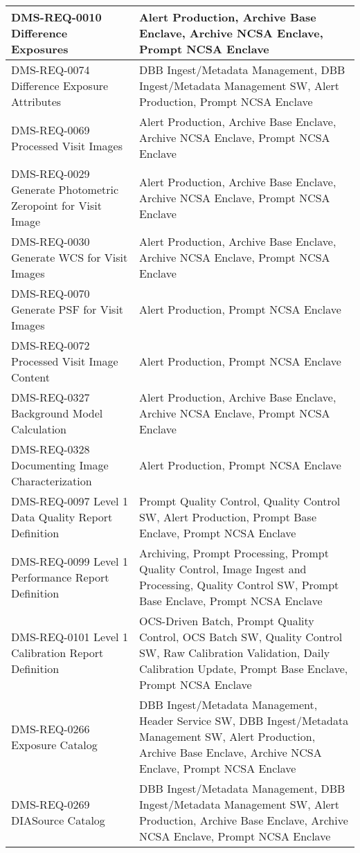 \begin{longtable}{p{}p{}}
DMS-REQ-0010 Difference Exposures & Alert Production, Archive Base Enclave, Archive NCSA Enclave, Prompt NCSA Enclave \\ \hline
DMS-REQ-0074 Difference Exposure Attributes & DBB Ingest/Metadata Management, DBB Ingest/Metadata Management SW, Alert Production, Prompt NCSA Enclave \\ \hline
DMS-REQ-0069 Processed Visit Images & Alert Production, Archive Base Enclave, Archive NCSA Enclave, Prompt NCSA Enclave \\ \hline
DMS-REQ-0029 Generate Photometric Zeropoint for Visit Image & Alert Production, Archive Base Enclave, Archive NCSA Enclave, Prompt NCSA Enclave \\ \hline
DMS-REQ-0030 Generate WCS for Visit Images & Alert Production, Archive Base Enclave, Archive NCSA Enclave, Prompt NCSA Enclave \\ \hline
DMS-REQ-0070 Generate PSF for Visit Images & Alert Production, Prompt NCSA Enclave \\ \hline
DMS-REQ-0072 Processed Visit Image Content & Alert Production, Prompt NCSA Enclave \\ \hline
DMS-REQ-0327 Background Model Calculation & Alert Production, Archive Base Enclave, Archive NCSA Enclave, Prompt NCSA Enclave \\ \hline
DMS-REQ-0328 Documenting Image Characterization & Alert Production, Prompt NCSA Enclave \\ \hline
DMS-REQ-0097 Level 1 Data Quality Report Definition & Prompt Quality Control, Quality Control SW, Alert Production, Prompt Base Enclave, Prompt NCSA Enclave \\ \hline
DMS-REQ-0099 Level 1 Performance Report Definition & Archiving, Prompt Processing, Prompt Quality Control, Image Ingest and Processing, Quality Control SW, Prompt Base Enclave, Prompt NCSA Enclave \\ \hline
DMS-REQ-0101 Level 1 Calibration Report Definition & OCS-Driven Batch, Prompt Quality Control, OCS Batch SW, Quality Control SW, Raw Calibration Validation, Daily Calibration Update, Prompt Base Enclave, Prompt NCSA Enclave \\ \hline
DMS-REQ-0266 Exposure Catalog & DBB Ingest/Metadata Management, Header Service SW, DBB Ingest/Metadata Management SW, Alert Production, Archive Base Enclave, Archive NCSA Enclave, Prompt NCSA Enclave \\ \hline
DMS-REQ-0269 DIASource Catalog & DBB Ingest/Metadata Management, DBB Ingest/Metadata Management SW, Alert Production, Archive Base Enclave, Archive NCSA Enclave, Prompt NCSA Enclave \\ \hline

\end{longtable}
